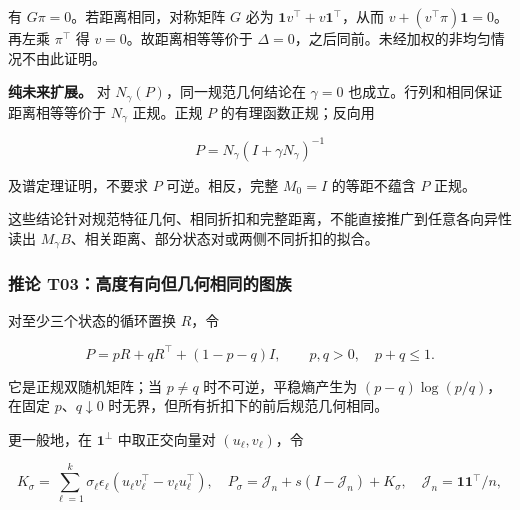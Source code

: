 \documentclass[11pt,a4paper]{article}
\begin{document}
有 \(G\pi=0\)。若距离相同，对称矩阵 \(G\) 必为
\(\mathbf1v^\top+v\mathbf1^\top\)，从而
\(v+(v^\top\pi)\mathbf1=0\)。再左乘 \(\pi^\top\) 得
\(v=0\)。故距离相等等价于
\(\Delta=0\)，之后同前。未经加权的非均匀情况不由此证明。

\par
\noindent\begin{minipage}{\linewidth}

\textbf{纯未来扩展。} 对 \(N_\gamma(P)\)，同一规范几何结论在
\(\gamma=0\) 也成立。行列和相同保证距离相等等价于 \(N_\gamma\)
正规。正规 \(P\) 的有理函数正规；反向用

\[
P=N_\gamma(I+\gamma N_\gamma)^{-1}
\]

\end{minipage}\par

及谱定理证明，不要求 \(P\) 可逆。相反，完整 \(M_0=I\) 的等距不蕴含 \(P\)
正规。

这些结论针对规范特征几何、相同折扣和完整距离，不能直接推广到任意各向异性读出
\(M_\gamma B\)、相关距离、部分状态对或两侧不同折扣的拟合。

\subsubsection{推论
T03：高度有向但几何相同的图族}\label{ux63a8ux8bba-t03ux9ad8ux5ea6ux6709ux5411ux4f46ux51e0ux4f55ux76f8ux540cux7684ux56feux65cf}

\par
\noindent\begin{minipage}{\linewidth}

对至少三个状态的循环置换 \(R\)，令

\[
P=pR+qR^\top+(1-p-q)I,
\qquad p,q>0,\quad p+q\le1.
\]

\end{minipage}\par

它是正规双随机矩阵；当 \(p\ne q\) 时不可逆，平稳熵产生为
\((p-q)\log(p/q)\)，在固定 \(p\)、\(q\downarrow0\)
时无界，但所有折扣下的前后规范几何相同。

\par
\noindent\begin{minipage}{\linewidth}

更一般地，在 \(\mathbf1^\perp\) 中取正交向量对 \((u_\ell,v_\ell)\)，令

\[
K_\sigma=\sum_{\ell=1}^k\sigma_\ell\epsilon_\ell
(u_\ell v_\ell^\top-v_\ell u_\ell^\top),
\quad P_\sigma=\mathcal J_n+s(I-\mathcal J_n)+K_\sigma,
\quad\mathcal J_n=\mathbf1\mathbf1^\top/n,
\]

\end{minipage}\par
\end{document}
